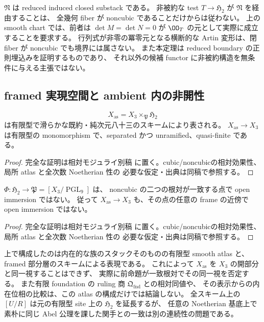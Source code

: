 \begin{remark}
$\mathfrak N$ は reduced induced closed substack である。
非被約な test $T\to\mathfrak H_2$ が $\mathfrak N$ を経由することは、
全幾何 fiber が noncubic であることだけからは従わない。
上の smooth chart では、前者は $\det M=\det N=0$ が
$\OO_T$ の元として実際に成立することを要求する。
行列式が非零の冪零元となる横断的な Artin 変形は、閉 fiber が noncubic でも境界には属さない。
また本定理は reduced boundary の正則埋込みを証明するものであり、
それ以外の候補 functor に非被約構造を無条件に与える主張ではない。
\end{remark}

\subsection{framed 実現空間と ambient 内の非開性}

\begin{corollary}
\label{cor:global-xas-smooth-scheme}
\[
 X_{\mathrm{as}}=X_3\times_{\mathfrak P}\mathfrak H_2
\]
は有限型で滑らかな既約・純次元八十三のスキームにより表される。
$X_{\mathrm{as}}\to X_3$ は有限型の monomorphism で、separated かつ unramified、quasi-finite である。
\end{corollary}

\begin{proof}
完全な証明は相対モジュライ別稿
\cite[内在的モジュライの有限型代数性・滑らかさ・境界]{QuadricModuli2026}
に置く。cubic/noncubicの相対効果性、局所 atlas と全次数 Noetherian 性の
必要な仮定・出典は同稿で参照する。
\end{proof}

\begin{proposition}
\label{prop:global-h2-not-ambient-open}
$\Phi:\mathfrak H_2\to\mathfrak P=[X_3/\operatorname{PGL}_9]$ は、
noncubic の二つの根対が一致する点で open immersion ではない。
従って $X_{\mathrm{as}}\to X_3$ も、その点の任意の frame の近傍で open immersion ではない。
\end{proposition}

\begin{proof}
完全な証明は相対モジュライ別稿
\cite[内在的モジュライの有限型代数性・滑らかさ・境界]{QuadricModuli2026}
に置く。cubic/noncubicの相対効果性、局所 atlas と全次数 Noetherian 性の
必要な仮定・出典は同稿で参照する。
\end{proof}

\begin{remark}[表現可能性から自動的には出ない比較]
上で構成したのは内在的な族のスタックそのものの有限型 smooth atlas と、
framed 部分層のスキームによる表現である。
これによって $X_{\mathrm{as}}$ を $X_3$ の開部分と同一視することはできず、
実際に前命題が一致根対でその同一視を否定する。
また有限 foundation の ruling 商 $\mathfrak Q_{\mathrm{fnd}}$ との相対同値や、
その表示からの内在位相の比較は、この atlas の構成だけでは結論しない。
全スキーム上の $[U/R]$ は元の有限型 site 上の $\mathfrak H_2$ を延長するが、
任意の Noetherian 基底上で素朴に同じ Abel 公理を課した関手との一致は別の連続性の問題である。
\end{remark}
